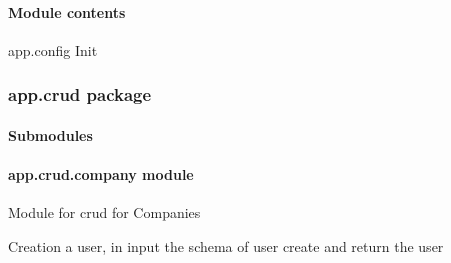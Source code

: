 \documentclass[letterpaper,10pt,english]{sphinxmanual}
\begin{document}
\paragraph{Module contents}
\label{\detokenize{app.config:module-app.config}}\label{\detokenize{app.config:module-contents}}
\sphinxAtStartPar
app.config Init

\sphinxstepscope


\subsubsection{app.crud package}
\label{\detokenize{app.crud:app-crud-package}}\label{\detokenize{app.crud::doc}}

\paragraph{Submodules}
\label{\detokenize{app.crud:submodules}}

\paragraph{app.crud.company module}
\label{\detokenize{app.crud:module-app.crud.company}}\label{\detokenize{app.crud:app-crud-company-module}}
\sphinxAtStartPar
Module for crud for Companies

\begin{fulllineitems}
\label{\detokenize{app.crud:app.crud.company.create_company}}
\pysigstartsignatures
{}
\pysigstopsignatures
\sphinxAtStartPar
Creation a user, in input the schema of user create and return the user

\end{fulllineitems}

\end{document}
